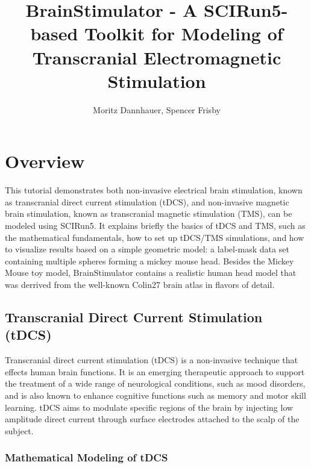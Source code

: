 \documentclass[fleqn,11pt,openany]{book}
\title{BrainStimulator - A SCIRun5-based Toolkit for Modeling of Transcranial Electromagnetic Stimulation}
\author{Moritz Dannhauer, Spencer Frisby}
\begin{document}

\maketitle


\chapter{Overview}

\begin{introduction}

This tutorial demonstrates both non-invasive electrical brain stimulation, known as transcranial direct current stimulation (tDCS), and non-invasive magnetic brain stimulation, known as transcranial magnetic stimulation (TMS), can be
modeled using SCIRun5. It explains briefly the basics of tDCS and TMS, such as the mathematical fundamentals, how to set up tDCS/TMS simulations, and how to visualize results based on a simple geometric model: a label-mask data set containing multiple spheres forming a mickey mouse head.
Besides the Mickey Mouse toy model, BrainStimulator contains a realistic human head model that was derrived from the well-known Colin27 brain atlas in flavors of detail. 

\end{introduction}

\section{Transcranial Direct Current Stimulation (tDCS)}

Transcranial direct current stimulation (tDCS) is a non-invasive technique that effects human brain functions.
It is an emerging therapeutic approach to support the treatment of a wide range of neurological conditions, such as mood disorders, and is also known to enhance cognitive functions such as memory and motor skill learning.
tDCS aims to modulate specific regions of the brain by injecting low amplitude direct current through surface electrodes attached to the scalp of the subject.

\subsection{Mathematical Modeling of tDCS}
\end{document}
